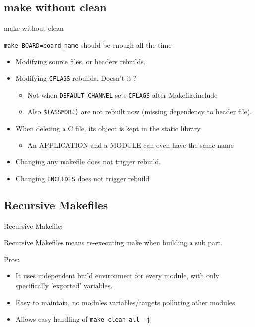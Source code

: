 \documentclass[ucs,9pt]{beamer}
\begin{document}
\subsection{make without clean}

\begin{frame}{make without clean}

  \texttt{make BOARD=board\_name} should be enough all the time

  \begin{itemize}
    \item \pause
      Modifying source files, or headers rebuilds.
    \item
      Modifying \texttt{CFLAGS} rebuilds.
      \pause Doesn't it ?

      \begin{itemize}
        \item
          Not when \texttt{DEFAULT\_CHANNEL} sets \texttt{CFLAGS} after Makefile.include
        \item
          Also \texttt{\$(ASSMOBJ)} are not rebuilt now (missing dependency to header file).
      \end{itemize}

    \item \pause
      When deleting a C file, its object is kept in the static library

      \begin{itemize}
        \item
          An APPLICATION and a MODULE can even have the same name
      \end{itemize}

    \item \pause
      Changing any makefile does not trigger rebuild.
    \item
      Changing \texttt{INCLUDES} does not trigger rebuild

  \end{itemize}

\end{frame}


\subsection{Recursive Makefiles}

\begin{frame}{Recursive Makefiles}

  Recursive Makefiles means re-executing make when building a sub part.

  \bigskip \pause
  Pros:

  \begin{itemize}
    \item
      It uses independent build environment for every module, with only specifically 'exported' variables.
    \item
      Easy to maintain, no modules variables/targets polluting other modules
    \item
      Allows easy handling of \texttt{make clean all -j}
  \end{itemize}

\end{frame}
\end{document}
